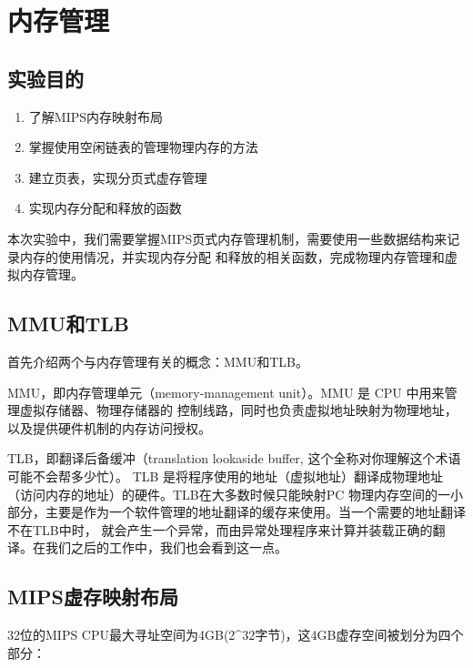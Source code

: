 \chapter{内存管理}

\section{实验目的}
  \begin{enumerate}
    \item 了解MIPS内存映射布局
    \item 掌握使用空闲链表的管理物理内存的方法
    \item 建立页表，实现分页式虚存管理
    \item 实现内存分配和释放的函数
  \end{enumerate}

本次实验中，我们需要掌握MIPS页式内存管理机制，需要使用一些数据结构来记录内存的使用情况，并实现内存分配
和释放的相关函数，完成物理内存管理和虚拟内存管理。

\section{MMU和TLB}

首先介绍两个与内存管理有关的概念：MMU和TLB。

\begin{note}
MMU，即内存管理单元（memory‐management unit）。MMU 是 CPU 中用来管理虚拟存储器、物理存储器的
控制线路，同时也负责虚拟地址映射为物理地址，以及提供硬件机制的内存访问授权。
\end{note}

\begin{note}
TLB，即翻译后备缓冲（translation lookaside buffer, 这个全称对你理解这个术语可能不会帮多少忙）。
TLB 是将程序使用的地址（虚拟地址）翻译成物理地址（访问内存的地址）的硬件。TLB在大多数时候只能映射PC
物理内存空间的一小部分，主要是作为一个软件管理的地址翻译的缓存来使用。当一个需要的地址翻译不在TLB中时，
就会产生一个异常，而由异常处理程序来计算并装载正确的翻译。在我们之后的工作中，我们也会看到这一点。
\end{note}

\section{MIPS虚存映射布局}

32位的MIPS CPU最大寻址空间为4GB(2\^{}32字节)，这4GB虚存空间被划分为四个部分：

